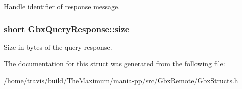 Handle identifier of response message. 

\hypertarget{structGbxQueryResponse_ab7d7e30d6beb443cdae8cbf95e4c89f3}{
\subsubsection[{size}]{\setlength{\rightskip}{0pt plus 5cm}short Gbx\-Query\-Response\-::size}}\label{structGbxQueryResponse_ab7d7e30d6beb443cdae8cbf95e4c89f3}


Size in bytes of the query response. 



The documentation for this struct was generated from the following file\-:\begin{DoxyCompactItemize}
\item 
/home/travis/build/\-The\-Maximum/mania-\/pp/src/\-Gbx\-Remote/\hyperlink{GbxStructs_8h}{Gbx\-Structs.\-h}\end{DoxyCompactItemize}
